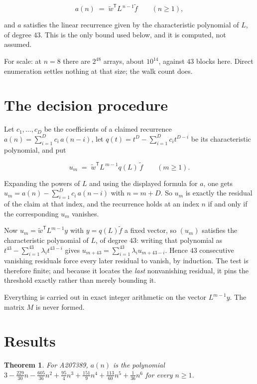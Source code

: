 \documentclass[11pt]{article}
\newtheorem{theorem}{Theorem}
\theoremstyle{definition}
\begin{document}
\[a(n) \;=\; \tilde w^{\mathsf T} L^{\,n-1} \tilde f \qquad (n \ge 1),\]

and $a$ satisfies the linear recurrence given by the characteristic polynomial of $L$, of degree $43$. This is the only bound used below, and it is computed, not assumed.

For scale: at $n = 8$ there are $2^{48}$ arrays, about $10^{14}$, against $43$ blocks here. Direct enumeration settles nothing at that size; the walk count does.

\section{The decision procedure}

Let $c_1,\dots,c_D$ be the coefficients of a claimed recurrence $a(n) = \sum_{i=1}^{D} c_i\,a(n-i)$, let $q(t) = t^{D} - \sum_{i=1}^{D} c_i t^{D-i}$ be its characteristic polynomial, and put

\[u_m \;=\; \tilde w^{\mathsf T} L^{\,m-1} q(L)\,\tilde f \qquad (m \ge 1).\]

Expanding the powers of $L$ and using the displayed formula for $a$, one gets $u_m = a(n) - \sum_{i=1}^{D} c_i\,a(n-i)$ with $n = m + D$. So $u_m$ is exactly the residual of the claim at that index, and the recurrence holds at an index $n$ if and only if the corresponding $u_m$ vanishes.

Now $u_m = \tilde w^{\mathsf T} L^{m-1} y$ with $y = q(L)\tilde f$ a fixed vector, so $(u_m)$ satisfies the characteristic polynomial of $L$, of degree $43$: writing that polynomial as $t^{43} - \sum_{i=1}^{43} \lambda_i t^{43-i}$ gives $u_{m+43} = \sum_{i=1}^{43} \lambda_i u_{m+43-i}$. Hence $43$ consecutive vanishing residuals force every later residual to vanish, by induction. The test is therefore finite; and because it locates the {\itshape last} nonvanishing residual, it pins the threshold exactly rather than merely bounding it.

Everything is carried out in exact integer arithmetic on the vector $L^{m-1}y$. The matrix $M$ is never formed.

\section{Results}

\begin{theorem} For A207389, $a(n)$ is the polynomial $3 - \frac{229}{30}n - \frac{605}{36}n^{2} + \frac{95}{4}n^{3} + \frac{151}{9}n^{4} + \frac{113}{60}n^{5} + \frac{1}{36}n^{6}$ for every $n \ge 1$.\end{theorem}
\end{document}
